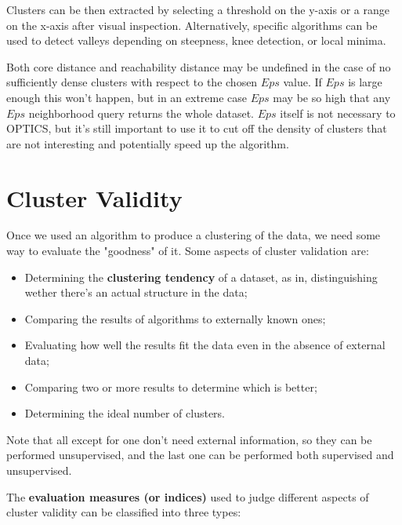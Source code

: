Clusters can be then extracted by selecting a threshold on the y-axis or a range on the x-axis after visual inspection. Alternatively, specific algorithms can be used to detect valleys depending on steepness, knee detection, or local minima.

Both core distance and reachability distance may be undefined in the case of no sufficiently dense clusters with respect to the chosen $Eps$ value. If $Eps$ is large enough this won't happen, but in an extreme case $Eps$ may be so high that any $Eps$ neighborhood query returns the whole dataset. $Eps$ itself is not necessary to OPTICS, but it's still important to use it to cut off the density of clusters that are not interesting and potentially speed up the algorithm.

\section{Cluster Validity}

Once we used an algorithm to produce a clustering of the data, we need some way to evaluate the "goodness" of it. Some aspects of cluster validation are:

\begin{itemize}
    \item Determining the \textbf{clustering tendency} of a dataset, as in, distinguishing wether there's an actual structure in the data;

    \item Comparing the results of algorithms to externally known ones;

    \item Evaluating how well the results fit the data even in the absence of external data;

    \item Comparing two or more results to determine which is better;

    \item Determining the ideal number of clusters.
\end{itemize}

Note that all except for one don't need external information, so they can be performed unsupervised, and the last one can be performed both supervised and unsupervised.

The \textbf{evaluation measures (or indices)} used to judge different aspects of cluster validity can be classified into three types:

